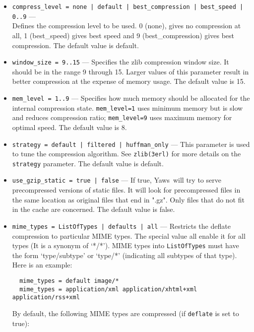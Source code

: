 \documentclass[11pt,oneside,english]{book}
\newcommand{\Yaws}            %
        {{\sc Yaws}}
\begin{document}
\begin{itemize}
\begin{itemize}
             \item \verb+compress_level = none | default | best_compression | best_speed | 0..9+ ---\\
               Defines the compression level to be used. 0 (none), gives no
               compression at all, 1 (best\_speed) gives best speed and 9
               (best\_compression) gives best compression. The default value is
               default.

             \item \verb+window_size = 9..15+ --- Specifies the zlib compression
               window size. It should be in the range 9 through 15. Larger
               values of this parameter result in better compression at the
               expense of memory usage. The default value is 15.

             \item \verb+mem_level = 1..9+ --- Specifies how much memory should
               be allocated for the internal compression
               state. \verb+mem_level=1+ uses minimum memory but is slow and
               reduces compression ratio; \verb+mem_level=9+ uses maximum memory
               for optimal speed. The default value is 8.

             \item \verb+strategy = default | filtered | huffman_only+ --- This
               parameter is used to tune the compression algorithm. See
               \verb+zlib(3erl)+ for more details on the \verb+strategy+
               parameter. The default value is default.

             \item \verb+use_gzip_static = true | false+ --- If true,
               \Yaws\ will try to serve precompressed versions of static
               files. It will look for precompressed files in the same location
               as original files that end in ".gz". Only files that do not fit
               in the cache are concerned. The default value is false.

             \item \verb+mime_types = ListOfTypes | defaults | all+ ---
               Restricts the deflate compression to particular MIME types. The
               special value all enable it for all types (It is a synonym of
               `*/*'). MIME types into \verb+ListOfTypes+ must have the form
               `type/subtype' or `type/*' (indicating all subtypes of that
               type). Here is an example:
\begin{verbatim}
  mime_types = default image/*
  mime_types = application/xml application/xhtml+xml application/rss+xml
\end{verbatim}
                    By default, the following MIME types are compressed (if
                    \verb+deflate+ is set to true):


\end{itemize}
\end{itemize}
\end{document}
